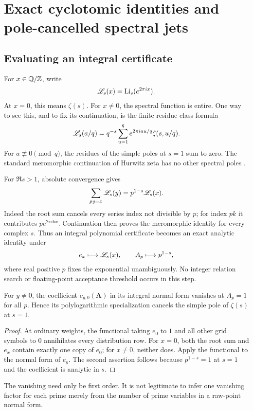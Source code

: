 \section{Exact cyclotomic identities and pole-cancelled spectral jets}
\label{ir:sec:identities}

\subsection{Evaluating an integral certificate}
For $x\in\mathbb Q/\mathbb Z$, write
\[
 \mathscr L_{s}(x)=\operatorname{Li}_s(e^{2\pi i x}).
\]
At $x=0$, this means $\zeta(s)$. For $x\ne0$, the spectral function
is entire. One way to see this, and to fix its continuation, is the
finite residue-class formula
\begin{equation}\label{ir:eq:fourier-hurwitz}
 \mathscr L_{s}(a/q)=q^{-s}\sum_{u=1}^{q}e^{2\pi i au/q}\zeta(s,u/q).
\end{equation}
For $a\not\equiv0\pmod q$, the residues of the simple poles at
$s=1$ sum to zero. The standard meromorphic continuation of Hurwitz
zeta has no other spectral poles \cite{dlmf-hurwitz}.

For $\Re s>1$, absolute convergence gives
\begin{equation}\label{ir:eq:analytic-distribution}
 \sum_{py=x}\mathscr L_{s}(y)=p^{1-s}\mathscr L_{s}(x).
\end{equation}
Indeed the root sum cancels every series index not divisible by $p$;
for index $pk$ it contributes $p e^{2\pi i kx}$.
Continuation then proves the meromorphic identity for every complex
$s$. Thus an integral polynomial certificate becomes an exact analytic
identity under
\begin{equation}\label{ir:eq:polylog-weights}
 e_x\longmapsto\mathscr L_{s}(x),\qquad A_p\longmapsto p^{1-s},
\end{equation}
where real positive $p$ fixes the exponential unambiguously. No integer
relation search or floating-point acceptance threshold occurs in this
step.

\begin{proposition}
\label{ir:prop:endpoint-zero}
For $y\ne0$, the coefficient $c_{y,0}(\mathbf A)$ in its integral
normal form vanishes at $A_p=1$ for all $p$. Hence its polylogarithmic
specialization cancels the simple pole of $\zeta(s)$ at $s=1$.
\end{proposition}
\begin{proof}
At ordinary weights, the functional taking $e_0$ to $1$ and all
other grid symbols to $0$ annihilates every distribution row. For
$x=0$, both the root sum and $e_x$ contain exactly one copy of
$e_0$; for $x\ne0$, neither does. Apply the functional to the
normal form of $e_y$. The second assertion follows because
$p^{1-s}=1$ at $s=1$ and the coefficient is analytic in $s$.
\end{proof}
The vanishing need only be first order. It is not legitimate to infer
one vanishing factor for each prime merely from the number of prime
variables in a raw-point normal form.

